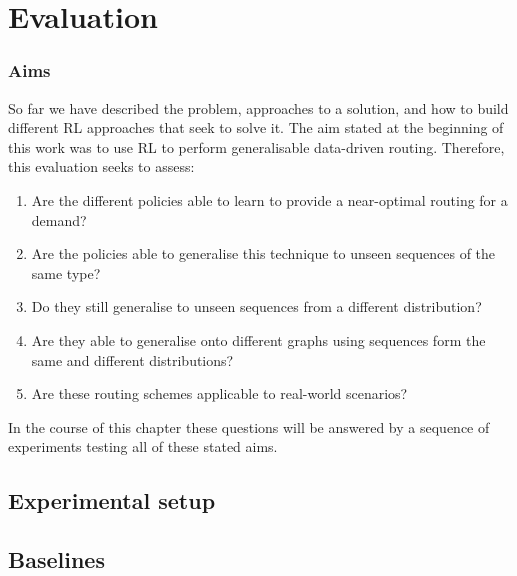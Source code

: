 \chapter{Evaluation}
\label{chapter:evaluation}

\subsection{Aims}
So far we have described the problem, approaches to a solution, and how to build different RL approaches that seek to solve it. The aim stated at the beginning of this work was to use RL to perform generalisable data-driven routing. Therefore, this evaluation seeks to assess:

\begin{enumerate}
\item Are the different policies able to learn to provide a near-optimal routing for a demand?
\item Are the policies able to generalise this technique to unseen sequences of the same type?
\item Do they still generalise to unseen sequences from a different distribution?
\item Are they able to generalise onto different graphs using sequences form the same and different distributions?
\item Are these routing schemes applicable to real-world scenarios?
\end{enumerate}

In the course of this chapter these questions will be answered by a sequence of experiments testing all of these stated aims.

\section{Experimental setup}


\section{Baselines}

